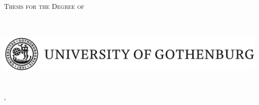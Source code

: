 
\begin{titlepage}
  \centering

  {\scshape Thesis for the Degree of \degree}\\[2cm]
%
  {\Huge \phdtitle}\\[0.3cm]
  {\Large\itshape \phdsubtitle}\\[2cm]
%
  {\LARGE\scshape \phdauthor}

  \vfill

  \includegraphics[width=\textwidth]{img/GU.png}\\[0.5cm]

\phddepartment\\
\phduniversity\\
\phdcity, \phdcountry ~\phdyear

\end{titlepage}
